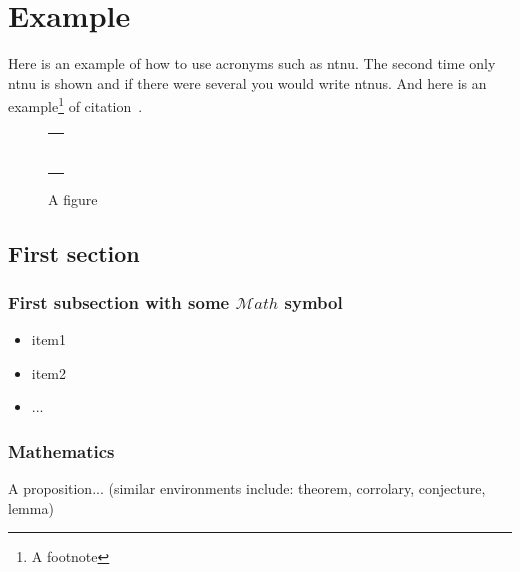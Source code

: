 \chapter{Example}
\label{ch:example} 

Here is an example of how to use acronyms such as \gls{ntnu}. The second time only \gls{ntnu} is shown and if there were several you would write \glspl{ntnu}. And here is an example\footnote{A footnote} of citation~\cite{Author:year:XYZ}.
\cite{MK08} \cite{Mo13} \cite{Me12} \cite{St13}
\Blindtext[3][1]

\begin{figure}
\centering
\begin{tabular}{@{}c@{}}
\rule{.5\textwidth}{.5\textwidth} \\
\end{tabular}
\caption{\label{fig:example}A figure}
\end{figure}

\section{First section}\label{sec:first_section}

\subsection{First subsection with some \texorpdfstring{$\mathcal{M}ath$}{Math} symbol}\label{sec:first_ssection}

\blindtext
\begin{itemize}[topsep=-1em,parsep=0em,itemsep=0em] %
 \item item1
 \item item2
 \item ...
\end{itemize}

\subsection{Mathematics}

\blindmathtrue
\blindtext

\begin{proposition}\label{def:a_proposition}
A proposition... (similar environments include: theorem, corrolary, conjecture, lemma)

\end{proposition}

